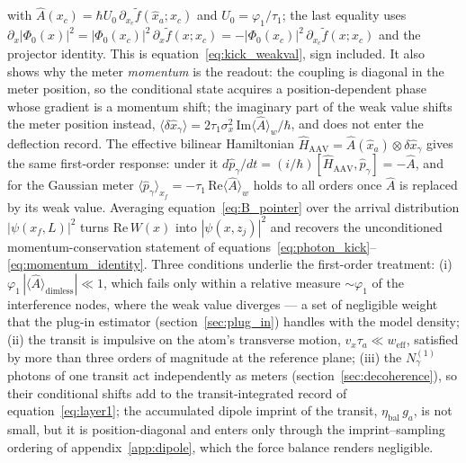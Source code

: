 \documentclass[11pt,a4paper]{article}
\newcommand{\weakval}[1]{\langle #1 \rangle_w}
\begin{document}
with $\hat{A}(x_c) = \hbar U_0\,\partial_{x_c}\tilde{f}(\hat{x}_a; x_c)$ and $U_0 = \varphi_1/\tau_1$; the last equality uses $\partial_x|\Phi_0(x)|^2 = |\Phi_0(x_c)|^2\,\partial_x\tilde{f}(x; x_c) = -|\Phi_0(x_c)|^2\,\partial_{x_c}\tilde{f}(x; x_c)$ and the projector identity. This is equation~\eqref{eq:kick_weakval}, sign included. It also shows why the meter \emph{momentum} is the readout: the coupling is diagonal in the meter position, so the conditional state acquires a position-dependent phase whose gradient is a momentum shift; the imaginary part of the weak value shifts the meter position instead, $\langle\delta\hat{x}_\gamma\rangle = 2\tau_1\sigma_x^2\,\mathrm{Im}\weakval{\hat{A}}/\hbar$, and does not enter the deflection record. The effective bilinear Hamiltonian $\hat{H}_\text{AAV} = \hat{A}(\hat{x}_a)\otimes\delta\hat{x}_\gamma$ gives the same first-order response: under it $d\hat{p}_\gamma/dt = (i/\hbar)[\hat{H}_\text{AAV}, \hat{p}_\gamma] = -\hat{A}$, and for the Gaussian meter $\langle\hat{p}_\gamma\rangle_{x_f} = -\tau_1\,\mathrm{Re}\weakval{\hat{A}}$ holds to all orders once $\hat{A}$ is replaced by its weak value. Averaging equation~\eqref{eq:B_pointer} over the arrival distribution $|\psi(x_f, L)|^2$ turns $\mathrm{Re}\,W(x)$ into $|\psi(x, z_j)|^2$ and recovers the unconditioned momentum-conservation statement of equations~\eqref{eq:photon_kick}--\eqref{eq:momentum_identity}. Three conditions underlie the first-order treatment: (i) $\varphi_1\,|\langle\hat{A}\rangle_\text{dimless}| \ll 1$, which fails only within a relative measure $\sim\varphi_1$ of the interference nodes, where the weak value diverges --- a set of negligible weight that the plug-in estimator (section~\ref{sec:plug_in}) handles with the model density; (ii) the transit is impulsive on the atom's transverse motion, $v_x\tau_a \ll w_\text{eff}$, satisfied by more than three orders of magnitude at the reference plane; (iii) the $N_\gamma^{(1)}$ photons of one transit act independently as meters (section~\ref{sec:decoherence}), so their conditional shifts add to the transit-integrated record of equation~\eqref{eq:layer1}; the accumulated dipole imprint of the transit, $\eta_\text{bal}\,g_a$, is not small, but it is position-diagonal and enters only through the imprint--sampling ordering of appendix~\ref{app:dipole}, which the force balance renders negligible.
\end{document}
